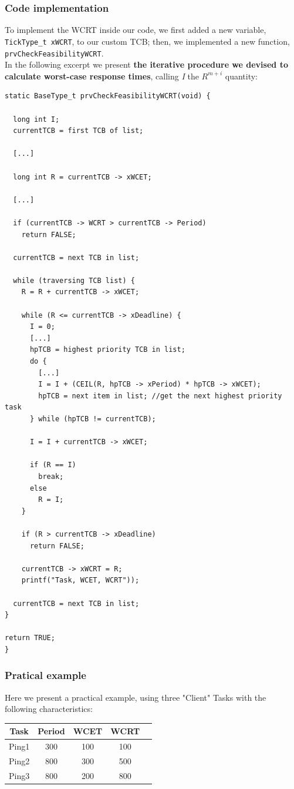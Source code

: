 \documentclass[10pt]{article}
\begin{document}
\subsubsection{Code implementation}
To implement the WCRT inside our code, we first added a new variable, \verb| TickType_t xWCRT|, to our custom TCB; then, we implemented a new function, \verb|prvCheckFeasibilityWCRT|.\\
In the following excerpt we present \textbf{the iterative procedure we devised to calculate worst-case response times}, calling \textit{I} the $R^{m+i}$ quantity: \\
\begin{lstlisting}
static BaseType_t prvCheckFeasibilityWCRT(void) {

  long int I;
  currentTCB = first TCB of list;

  [...]

  long int R = currentTCB -> xWCET;

  [...]

  if (currentTCB -> WCRT > currentTCB -> Period)
    return FALSE;

  currentTCB = next TCB in list;

  while (traversing TCB list) {
    R = R + currentTCB -> xWCET;

    while (R <= currentTCB -> xDeadline) {
      I = 0;
      [...]
      hpTCB = highest priority TCB in list;
      do {
        [...]
        I = I + (CEIL(R, hpTCB -> xPeriod) * hpTCB -> xWCET);
        hpTCB = next item in list; //get the next highest priority task
      } while (hpTCB != currentTCB);

      I = I + currentTCB -> xWCET;

      if (R == I)
        break;
      else
        R = I;
    }

    if (R > currentTCB -> xDeadline)
      return FALSE;

    currentTCB -> xWCRT = R;
    printf("Task, WCET, WCRT"));

  currentTCB = next TCB in list;
}

return TRUE;
}
\end{lstlisting}

\subsubsection{Pratical example}
Here we present a practical example, using three "Client" Tasks with the following characteristics:
\begin{center}
\begin{tabular}{|c||c|c|c|c|}
\hline 
\rule[-1ex]{0pt}{2.5ex} Task & Period & WCET & WCRT \\ 
\hline 
\rule[-1ex]{0pt}{2.5ex} Ping1 & 300 & 100 & 100\\ 
\hline 
\rule[-1ex]{0pt}{2.5ex} Ping2 & 800 & 300 & 500\\ 
\hline 
\rule[-1ex]{0pt}{2.5ex} Ping3 & 800 & 200 & 800\\ 
\hline 
\end{tabular}
\end{center}
\end{document}
